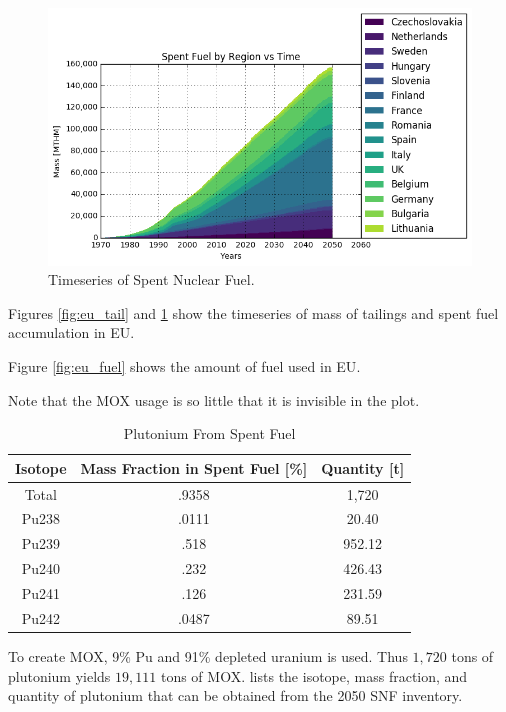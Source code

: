 \begin{figure}[htbp!]
	\begin{center}
			\includegraphics[scale=0.7]{./images/eu_future/snf.png}
	\end{center}
	\caption{Timeseries of Spent Nuclear Fuel.}
	\label{fig:eu_snf}
\end{figure}
\FloatBarrier

Figures \ref{fig:eu_tail} and \ref{fig:eu_snf} show the 
timeseries of mass of tailings and spent fuel accumulation in \gls{EU}.

Figure \ref{fig:eu_fuel} shows the amount of fuel used in \gls{EU}.

Note that the MOX usage is so little that it is invisible in the
plot. 

\begin{table}[h]
	\centering
	\begin{tabular}{|c|c|c|}
		\hline
		Isotope & Mass Fraction in Spent Fuel [\%] & Quantity [t] \\ \hline
		Total & .9358 & 1,720 \\ \hline
		Pu238 & .0111 & 20.40 \\ \hline
		Pu239 & .518 & 952.12 \\ \hline
		Pu240 & .232 & 426.43 \\ \hline
		Pu241 & .126 & 231.59 \\ \hline
		Pu242 & .0487 & 89.51 \\ \hline
	\end{tabular}
	\caption{Plutonium From Spent Fuel}
	\label{tab:pu}
\end{table}


To create \gls{MOX}, 9\% Pu and 91\% depleted uranium is used.
Thus $1,720$ tons of plutonium yields $19,111$ tons of
\gls{MOX}.  lists the isotope, mass fraction,
and quantity of plutonium that can be obtained from the 2050 \gls{SNF} inventory.


